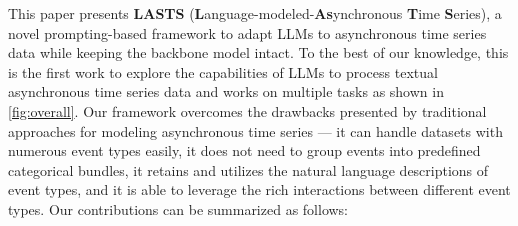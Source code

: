 


This paper presents \textbf{LASTS} (\textbf{L}anguage-modeled-\textbf{As}ynchronous \textbf{T}ime \textbf{S}eries), a novel prompting-based framework to adapt LLMs to asynchronous time series data while keeping the backbone model intact. To the best of our knowledge, this is the first work to explore the capabilities of LLMs to process textual asynchronous time series data and works on multiple tasks as shown in \autoref{fig:overall}. {Our framework overcomes the drawbacks presented by traditional approaches for modeling asynchronous time series --- it can handle datasets with numerous event types easily, it does not need to group events into predefined categorical bundles, it retains and utilizes the natural language descriptions of event types, and it is able to leverage the rich interactions between different event types.} Our contributions can be summarized as follows: 

